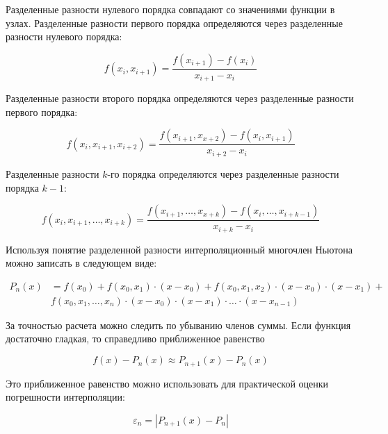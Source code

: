 Разделенные разности нулевого порядка совпадают со значениями функции в узлах.
Разделенные разности первого порядка определяются через разделенные разности
нулевого порядка:

$$f(x_i, x_{i+1})=\frac{f(x_{i+1}) - f(x_{i})}{x_{i+1} - x_i}$$

Разделенные разности второго порядка определяются через разделенные разности
первого порядка:

$$f(x_i, x_{i+1}, x_{i+2})=\frac{f(x_{i+1},x_{x+2}) - f(x_{i},x_{i+1})}
{x_{i+2} - x_i}$$

Разделенные разности $k$-го порядка определяются через разделенные разности
порядка $k-1$:

$$f(x_i, x_{i+1}, \hdots, x_{i+k})= \frac{ f(x_{i+1}, \dots, x_{x+k}) -
f(x_{i}, \dots, x_{i+k-1})}
{x_{i+k} - x_i}$$

Используя понятие разделенной разности интерполяционный многочлен Ньютона
можно записать в следующем виде:

\begin{equation*}\begin{split}
    P_n(x) & = f(x_0) + f(x_0, x_1)\cdot(x-x_0) +
    f(x_0, x_1, x_2)\cdot(x-x_0)\cdot(x-x_1) + {}\\
    & f(x_0, x_1,\dots, x_n)\cdot(x-x_0)\cdot(x-x_1)\cdot\hdots\cdot(x-x_{n-1})
\end{split}
\end{equation*}

За точностью расчета можно следить по убыванию членов суммы. Если функция
достаточно гладкая, то справедливо приближенное равенство

$$f(x) - P_n(x) \approx P_{n+1}(x) - P_n(x)$$

Это приближенное равенство можно использовать для практической оценки
погрешности интерполяции:

$$\varepsilon_n = |P_{n+1}(x) - P_{n}|$$

\pagebreak